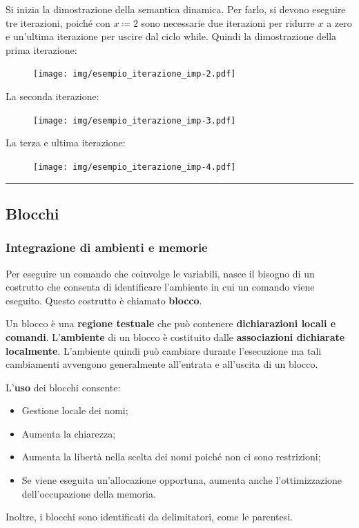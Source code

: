 \documentclass[a4paper]{article}
\newcommand{\longline}{\noindent\rule{\textwidth}{0.4pt}}
\begin{document}
 	\noindent
 	Si inizia la dimostrazione della semantica dinamica. Per farlo, si devono eseguire tre iterazioni, poiché con $x\coloneq2$ sono necessarie due iterazioni per ridurre $x$ a zero e un'ultima iterazione per uscire dal ciclo \textsf{while}. Quindi la dimostrazione della prima iterazione:
 	\begin{figure}[!htp]
 		\centering
 		\texttt{[image: img/esempio\_iterazione\_imp-2.pdf]}
 	\end{figure}
 	
 	\noindent
 	La seconda iterazione:
 	\begin{figure}[!htp]
 		\centering
 		\texttt{[image: img/esempio\_iterazione\_imp-3.pdf]}
 	\end{figure}\newpage
 	
 	\noindent
 	La terza e ultima iterazione:
 	\begin{figure}[!htp]
 		\centering
 		\texttt{[image: img/esempio\_iterazione\_imp-4.pdf]}
 	\end{figure}
 	
 	\longline
 	
 	\subsection{Blocchi}
 	
 	\subsubsection{Integrazione di ambienti e memorie}
 	
 	Per eseguire un comando che coinvolge le variabili, nasce il bisogno di un costrutto che consenta di identificare l'ambiente in cui un comando viene eseguito. Questo costrutto è chiamato \textcolor{Red3}{\textbf{blocco}}.\newline
 	
 	\noindent
 	Un blocco è una \textbf{regione testuale} che può contenere \textbf{dichiarazioni locali e comandi}. L'\textbf{ambiente} di un blocco è costituito dalle \textbf{associazioni dichiarate localmente}. L'ambiente quindi può cambiare durante l'esecuzione ma tali cambiamenti avvengono generalmente all'entrata e all'uscita di un blocco.\newline
 	
 	\noindent
 	L'\textbf{uso} dei blocchi consente:
 	\begin{itemize}
 		\item Gestione locale dei nomi;
 		\item Aumenta la chiarezza;
 		\item Aumenta la libertà nella scelta dei nomi poiché non ci sono restrizioni;
 		\item Se viene eseguita un'allocazione opportuna, aumenta anche l'ottimizzazione dell'occupazione della memoria.
 	\end{itemize}
 	Inoltre, i blocchi sono identificati da delimitatori, come le parentesi.\newpage
 	
\end{document}
